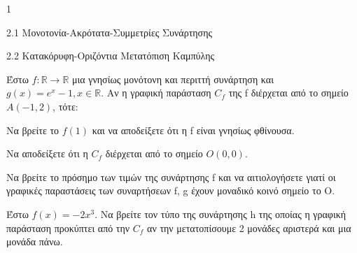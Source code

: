 \begin{ylh}{1}
\item 2.1 Μονοτονία-Ακρότατα-Συμμετρίες Συνάρτησης
\item 2.2 Κατακόρυφη-Οριζόντια Μετατόπιση Καμπύλης
\end{ylh}
Έστω $f: \mathbb{R} \to \mathbb{R}$ μια γνησίως μονότονη και περιττή συνάρτηση και $g(x) = e^x - 1, x \in \mathbb{R}$. Αν η γραφική παράσταση $C_f$ της f διέρχεται από το σημείο $A(-1, 2)$, τότε:
\begin{alist}
\item Να βρείτε το $f(1)$ και να αποδείξετε ότι η f είναι γνησίως φθίνουσα.
\item Να αποδείξετε ότι η $C_f$ διέρχεται από το σημείο $O(0, 0)$.
\item Να βρείτε το πρόσημο των τιμών της συνάρτησης f και να αιτιολογήσετε γιατί οι γραφικές παραστάσεις των συναρτήσεων f, g έχουν μοναδικό κοινό σημείο το Ο.
\item Έστω $f(x) = -2x^3$. Να βρείτε τον τύπο της συνάρτησης h της οποίας η γραφική παράσταση προκύπτει από την $C_f$ αν την μετατοπίσουμε 2 μονάδες αριστερά και μια μονάδα πάνω.
\end{alist}

